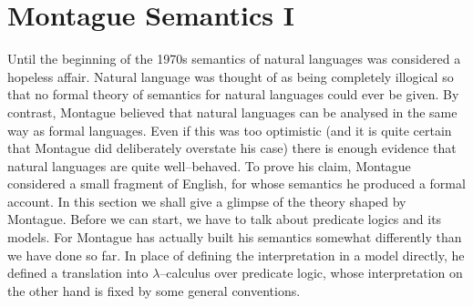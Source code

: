 \section{Montague Semantics I}
\label{kap3-6}
%
%
%
Until the beginning of the 1970s semantics of natural languages was
considered a hopeless affair. Natural language was thought of as 
being completely illogical so that no formal theory 
of semantics for natural languages could ever be given. By contrast, 
Montague 
believed that natural languages can be analysed in the same way as formal 
languages.  Even if this was too optimistic (and it is quite certain that
Montague did deliberately overstate his case) there is enough
evidence that natural languages are quite well--behaved. To prove
his claim, Montague considered a small fragment of English, for
whose semantics he produced a formal account. In this section we 
shall give a glimpse of the theory shaped by Montague. Before
we can start, we have to talk about predicate logics and its
models. For Montague has actually built his semantics somewhat
differently than we have done so far. In place of defining the
interpretation in a model directly, he defined a translation
into $\lambda$--calculus over predicate logic, whose interpretation
on the other hand is fixed by some general conventions.


